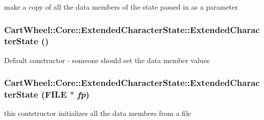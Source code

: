 \label{classCartWheel_1_1Core_1_1ExtendedCharacterState_af5c2f7196eb4522932e5172a6e4e606d}
make a copy of all the data members of the state passed in as a parameter \hypertarget{classCartWheel_1_1Core_1_1ExtendedCharacterState_a81f90c3c340e4d31aad8e0f4a8b4d1e2}{
\subsubsection[{ExtendedCharacterState}]{\setlength{\rightskip}{0pt plus 5cm}CartWheel::Core::ExtendedCharacterState::ExtendedCharacterState ()}}
\label{classCartWheel_1_1Core_1_1ExtendedCharacterState_a81f90c3c340e4d31aad8e0f4a8b4d1e2}
Default constructor -\/ someone should set the data member values \hypertarget{classCartWheel_1_1Core_1_1ExtendedCharacterState_aaf81412a6e91027525164060b345886e}{
\subsubsection[{ExtendedCharacterState}]{\setlength{\rightskip}{0pt plus 5cm}CartWheel::Core::ExtendedCharacterState::ExtendedCharacterState (FILE $\ast$ {\em fp})}}
\label{classCartWheel_1_1Core_1_1ExtendedCharacterState_aaf81412a6e91027525164060b345886e}
this contstructor initializes all the data members from a file 

